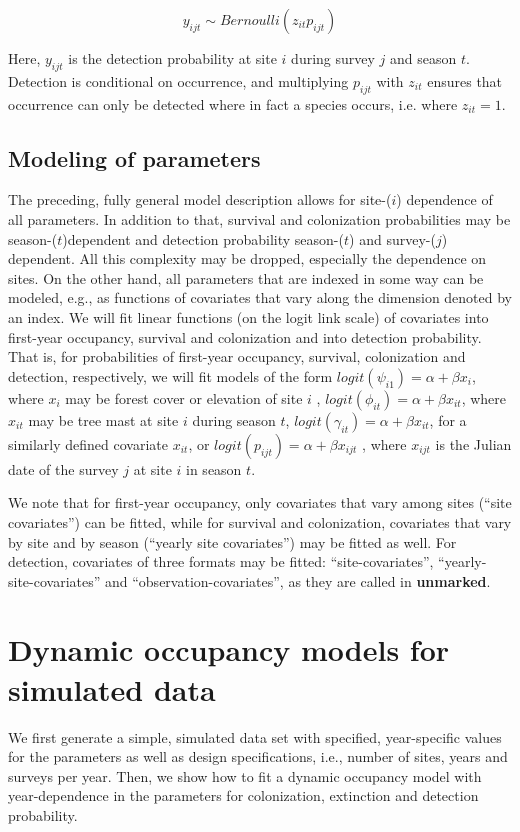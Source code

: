 \documentclass[12pt]{article}
\begin{document}
\[
 y_{ijt} \sim Bernoulli(z_{it} p_{ijt})
\]

Here, $y_{ijt}$ is the detection probability at site  $i$ during
survey $j$ and season $t$. Detection is conditional on occurrence, and
multiplying $p_{ijt}$ with $z_{it}$ ensures that occurrence can only
be detected where in fact a species occurs, i.e. where $z_{it}=1$.


\subsection{Modeling of parameters}
The preceding, fully general model description allows for site-($i$)
dependence of all parameters. In addition to that, survival and
colonization probabilities may be season-($t$)dependent and detection
probability season-($t$) and survey-($j$) dependent.
All this complexity may be dropped, especially the dependence on
sites. On the other hand, all parameters that are indexed in some way
can be modeled, e.g., as functions of covariates that vary along the
dimension denoted by an index. We will fit linear functions (on the
logit link scale) of covariates into first-year occupancy, survival
and colonization and into detection probability.
That is, for probabilities of first-year occupancy, survival,
colonization and detection, respectively, we will fit models of the
form
 $logit(\psi_{i1}) = \alpha + \beta x_i$, where $x_i$  may be forest
 cover or elevation of site $i$ ,
 $logit(\phi_{it}) = \alpha + \beta x_{it}$, where $x_{it}$  may be
 tree mast at site $i$ during season $t$,
 $logit(\gamma_{it}) = \alpha + \beta x_{it}$, for a similarly
 defined covariate $x_{it}$, or
 $logit(p_{ijt}) = \alpha + \beta x_{ijt}$ , where $x_{ijt}$ is the
 Julian date of the survey $j$ at site $i$ in season $t$.

We note that for first-year occupancy, only covariates that vary among
sites (``site covariates'') can be fitted, while for survival and
colonization, covariates that vary by site and by season (``yearly
site covariates'') may be fitted as well.
For detection, covariates of three formats may be fitted:
``site-covariates'', ``yearly-site-covariates'' and
``observation-covariates'', as
they are called in \textbf{unmarked}.




\section{Dynamic occupancy models for simulated data}
We first generate a simple, simulated data set
with specified, year-specific values for
the parameters as well as design specifications, i.e., number of
sites, years and surveys per year.
Then, we show how to fit a dynamic occupancy model with
year-dependence in the parameters for colonization, extinction and
detection probability.
\end{document}
